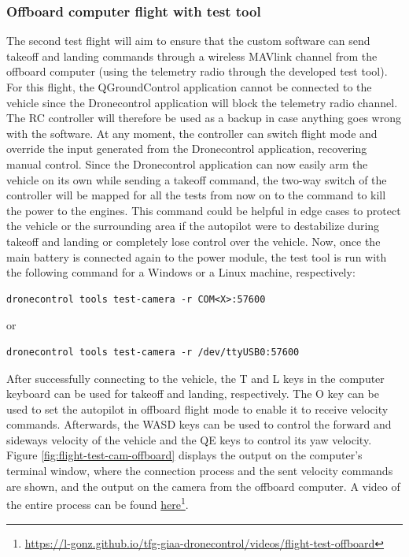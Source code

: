\subsubsection{Offboard computer flight with test tool}
\label{subsec:fl-test-2}

The second test flight will aim to ensure that the custom software can send takeoff and landing commands through a wireless MAVlink channel from the offboard computer (using the telemetry radio through the developed test tool).
For this flight, the QGroundControl application cannot be connected to the vehicle since the Dronecontrol application will block the telemetry radio channel.
The RC controller will therefore be used as a backup in case anything goes wrong with the software.
At any moment, the controller can switch flight mode and override the input generated from the Dronecontrol application, recovering manual control.
Since the Dronecontrol application can now easily arm the vehicle on its own while sending a takeoff command,
the two-way switch of the controller will be mapped for all the tests from now on to the command to kill the power to the engines.
This command could be helpful in edge cases to protect the vehicle or the surrounding area if the autopilot were to destabilize during takeoff and landing or completely lose control over the vehicle.
Now, once the main battery is connected again to the power module, the test tool is run with the following command for a Windows or a Linux machine, respectively:
\begin{verbatim}
dronecontrol tools test-camera -r COM<X>:57600
\end{verbatim}
or
\begin{verbatim}
dronecontrol tools test-camera -r /dev/ttyUSB0:57600
\end{verbatim}

After successfully connecting to the vehicle, the T and L keys in the computer keyboard can be used for takeoff and landing, respectively. The O key can be used to set the autopilot in offboard flight mode to enable it to receive velocity commands.
Afterwards, the WASD keys can be used to control the forward and sideways velocity of the vehicle and the QE keys to control its yaw velocity.
Figure \ref{fig:flight-test-cam-offboard} displays the output on the computer's terminal window, where the connection process and the sent velocity commands are shown, and the output on the camera from the offboard computer.
A video of the entire process can be found \href{https://l-gonz.github.io/tfg-giaa-dronecontrol/videos/flight-test-offboard}{here}\footnote{\url{https://l-gonz.github.io/tfg-giaa-dronecontrol/videos/flight-test-offboard}}.


